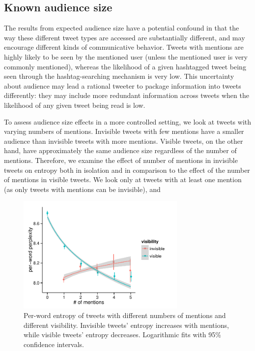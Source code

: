 \documentclass[11pt,letterpaper]{article}
\begin{document}
\subsection{Known audience size}

The results from expected audience size have a potential confound in that the way these different tweet types are accessed are substantially different, and may encourage different kinds of communicative behavior.  Tweets with mentions are highly likely to be seen by the mentioned user (unless the mentioned user is very commonly mentioned), whereas the likelihood of a given hashtagged tweet being seen through the hashtag-searching mechanism is very low.  This uncertainty about audience may lead a rational tweeter to package information into tweets differently: they may include more redundant information across tweets when the likelihood of any given tweet being read is low.

To assess audience size effects in a more controlled setting, we look at tweets with varying numbers of mentions.  Invisible tweets with few mentions have a smaller audience than invisible tweets with more mentions.  Visible tweets, on the other hand, have approximately the same audience size regardless of the number of mentions.  Therefore, we examine the effect of number of mentions in invisible tweets on entropy both in isolation and in comparison to the effect of the number of mentions in visible tweets.  We look only at tweets with at least one mention (as only tweets with mentions can be invisible), and 

\begin{figure}[t]
 \centering
  \includegraphics[width=3.25in]{figures/cmcl-mentions-pw2.pdf}
 \caption{Per-word entropy of tweets with different numbers of mentions and different visibility.  Invisible tweets' entropy increases with mentions, while visible tweets' entropy decreases.  Logarithmic fits with 95\% confidence intervals.}\label{fig:mentions}\vspace*{-.5em}
\end{figure}
\end{document}
